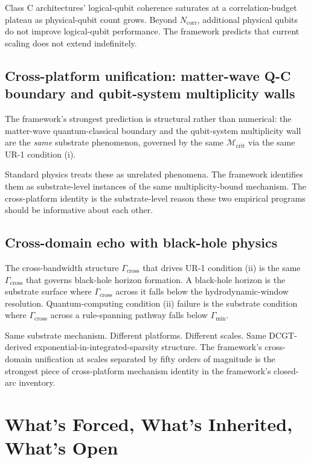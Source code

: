\documentclass[11pt,a4paper]{article}
\begin{document}
Class C architectures' logical-qubit coherence saturates at a correlation-budget plateau as physical-qubit count grows. Beyond $N_{\mathrm{corr}}$, additional physical qubits do not improve logical-qubit performance. The framework predicts that current scaling does not extend indefinitely.

\subsection{Cross-platform unification: matter-wave Q-C boundary and qubit-system multiplicity walls}

The framework's strongest prediction is structural rather than numerical: the matter-wave quantum-classical boundary and the qubit-system multiplicity wall are the \emph{same} substrate phenomenon, governed by the same $\mathcal{M}_{\mathrm{crit}}$ via the same UR-1 condition (i).

Standard physics treats these as unrelated phenomena. The framework identifies them as substrate-level instances of the same multiplicity-bound mechanism. The cross-platform identity is the substrate-level reason these two empirical programs should be informative about each other.

\subsection{Cross-domain echo with black-hole physics}

The cross-bandwidth structure $\Gamma_{\mathrm{cross}}$ that drives UR-1 condition (ii) is the same $\Gamma_{\mathrm{cross}}$ that governs black-hole horizon formation. A black-hole horizon is the substrate surface where $\Gamma_{\mathrm{cross}}$ across it falls below the hydrodynamic-window resolution. Quantum-computing condition (ii) failure is the substrate condition where $\Gamma_{\mathrm{cross}}$ across a rule-spanning pathway falls below $\Gamma_{\min}$.

Same substrate mechanism. Different platforms. Different scales. Same DCGT-derived exponential-in-integrated-sparsity structure. The framework's cross-domain unification at scales separated by fifty orders of magnitude is the strongest piece of cross-platform mechanism identity in the framework's closed-arc inventory.

\section{What's Forced, What's Inherited, What's Open}
\end{document}
